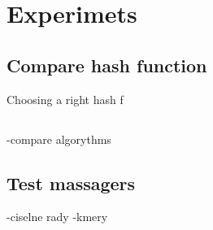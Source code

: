 \chapter{Experimets}

\section{Compare hash function}
Choosing a right hash f

\section{}
-compare algorythms

\section{Test massagers}
-ciselne rady
-kmery